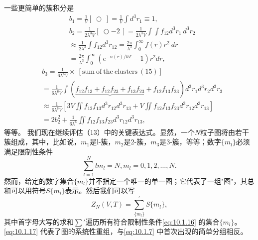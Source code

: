 一些更简单的簇积分是
\begin{equation}\tag{10.1.14}\label{eq:10.1.14}
\begin{aligned}&b_{1}=\frac{1}{V}[\:\bigcirc\:]=\frac{1}{V}\int d^{3}r_{1}\equiv1,\\&b_{2}=\frac{1}{2\lambda^{3}V}[\:\bigcirc-2\:]=\frac{1}{2\lambda^{3}V}\int\int f_{12}d^{3}r_{1}\:d^{3}r_{2}\\&\approx\frac{1}{2\lambda^{3}}\int f_{12}d^{3}r_{12}=\frac{2\pi}{\lambda^{3}}\int_{0}^{\infty}f(r)r^{2}\:dr\\&=\frac{2\pi}{\lambda^{3}}\int_{0}^{\infty}(e^{-u(r)/kT}-1)r^{2}dr,\end{aligned}
\end{equation}
\begin{equation}\tag{10.1.15}\label{eq:10.1.15}
\begin{array}{rl} & { b _ { 3 } = \frac { 1 } { 6 \lambda ^{6} V } \times \ [ \mathrm { s u m ~ o f ~ t h e ~ c l u s t e r s ~ ( 15 ) } ] } \\& { = \frac { 1 } { 6 \lambda ^{6} V } \int ( \underbrace { f _ { 12 } f _ { 13 } + f _ { 12 } f _ { 23 } + f _ { 13 } f _ { 23 } } _ { } + f _ { 12 } f _ { 13 } f _ { 23 } ) d ^{3} r _ { 1 } d ^{3} r _ { 2 } d ^{3} r _ { 3 } } \\& { \approx \frac { 1 } { 6 \lambda ^{6} V } \left[ 3 V \iint f _ { 12 } f _ { 13 } d ^{3} r _ { 12 } d ^{3} r _ { 13 } + V \iint f _ { 12 } f _ { 13 } f _ { 23 } d ^{3} r _ { 12 } d ^{3} r _ { 13 } \right] } \\& { = 2 b _ { 2 } ^{2} + \frac { 1 } { 6 \lambda ^{6} } \iint f _ { 12 } f _ { 13 } f _ { 23 } d ^{3} r _ { 12 } d ^{3} r _ { 13 } , } \end{array}
\end{equation}
等等。
我们现在继续评估（13）中的关键表达式。显然，一个\(N\)粒子图将由若干簇组成，其中，比如说，\(m_1\)是l-簇，\(m_2\)是2-簇，\(m_3\)是3-簇，等等；数字\(\{m_l\}\)必须满足限制性条件
\begin{equation}\tag{10.1.16}\label{eq:10.1.16}
\sum _ { l = 1 } ^{N} l m _ { l } = N ,  m _ { l } = 0 , 1 , 2 , \ldots , N .
\end{equation}
然而，给定的数字集合\(\{m_l\}\)并不指定一个唯一的单一图；它代表了一组"图"，其总和可以用符号\(S\{m_l\}\)表示。然后我们可以写
\begin{equation}\tag{10.1.17}\label{eq:10.1.17}
Z _ { N } ( V , T ) = \sum _ { \{ m _ { l } \} } ^{\prime} S \{ m _ { l } \} ,
\end{equation}
其中首字母大写的求和\(\sum'\)遍历所有符合限制性条件\autoref{eq:10.1.16} 的集合\(\{m_l\}\)。\autoref{eq:10.1.17} 代表了图的系统性重组，与\autoref{eq:10.1.7} 中首次出现的简单分组相反。
